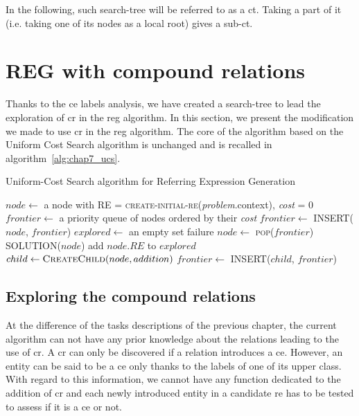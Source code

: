 In the following, such search-tree will be referred to as a \acrfull{ct}. Taking a part of it (i.e. taking one of its nodes as a local root) gives a sub-\acrshort{ct}.

\section{REG with compound relations}

Thanks to the \acrshort{ce} labels analysis, we have created a search-tree to lead the exploration of \acrshort{cr} in the \acrshort{reg} algorithm. In this section, we present the modification we made to use \acrshort{cr} in the \acrshort{reg} algorithm. The core of the algorithm based on the Uniform Cost Search algorithm is unchanged and is recalled in algorithm~\ref{alg:chap7_ucs}.

\begin{algorithm}[!ht]
\caption{Uniform-Cost Search algorithm for Referring Expression Generation}
\label{alg:chap7_ucs}
\begin{algorithmic}
    \State $node\leftarrow$ a node with RE = \textsc{create-initial-re}(\textit{problem}.context), \textit{cost} = 0
    \State $frontier\leftarrow$ a priority queue of nodes ordered by their \textit{cost}
    \State $frontier\leftarrow$ \textsc{INSERT}($node$, $frontier$)
    \State $explored\leftarrow$ an empty set
    \Loop
        	\State \Return failure
        \EndIf
        \State $node\leftarrow$ \textsc{pop}($frontier$)
        	\State \Return \textsc{SOLUTION}($node$)
        \EndIf
        \State add $node.RE$ to $explored$
            \State $child \leftarrow \textsc{CreateChild}(node, addition)$
            	\State $frontier\leftarrow$ \textsc{INSERT}($child$, $frontier$)
            \EndIf
        \EndFor
    \EndLoop
\EndFunction
\end{algorithmic}
\end{algorithm}

\subsection{Exploring the compound relations}

At the difference of the tasks descriptions of the previous chapter, the current algorithm can not have any prior knowledge about the relations leading to the use of \acrshort{cr}. A \acrshort{cr} can only be discovered if a relation introduces a \acrshort{ce}. However, an entity can be said to be a \acrshort{ce} only thanks to the labels of one of its upper class. With regard to this information, we cannot have any function dedicated to the addition of \acrshort{cr} and each newly introduced entity in a candidate \acrshort{re} has to be tested to assess if it is a \acrshort{ce} or not.

